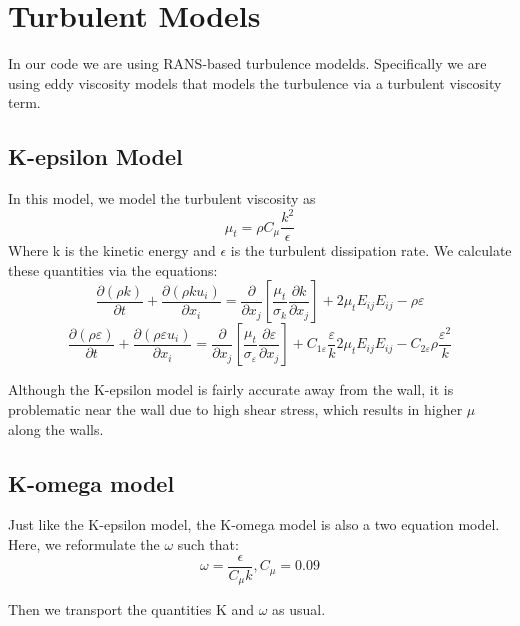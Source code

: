 \documentclass{article}
\begin{document}
\section{Turbulent Models}
In our code we are using RANS-based turbulence modelds. Specifically we are using eddy viscosity models that models the turbulence via a turbulent viscosity term. 

\subsection{K-epsilon Model}
In this model, we model the turbulent viscosity as
\begin{equation}
\mu_{t}=\rho C_{\mu} \frac{k^{2}}{\epsilon}
\end{equation}
Where k is the kinetic energy and $\epsilon$ is the turbulent dissipation rate. \newline
We calculate these quantities via the equations:
\begin{equation}
\frac{\partial(\rho k)}{\partial t}+\frac{\partial\left(\rho k u_{i}\right)}{\partial x_{i}}=\frac{\partial}{\partial x_{j}}\left[\frac{\mu_{t}}{\sigma_{k}} \frac{\partial k}{\partial x_{j}}\right]+2 \mu_{t} E_{i j} E_{i j}-\rho \varepsilon
\end{equation}
\begin{equation}
\frac{\partial(\rho \varepsilon)}{\partial t}+\frac{\partial\left(\rho \varepsilon u_{i}\right)}{\partial x_{i}}=\frac{\partial}{\partial x_{j}}\left[\frac{\mu_{t}}{\sigma_{\varepsilon}} \frac{\partial \varepsilon}{\partial x_{j}}\right]+C_{1 \varepsilon} \frac{\varepsilon}{k} 2 \mu_{t} E_{i j} E_{i j}-C_{2 \varepsilon} \rho \frac{\varepsilon^{2}}{k}
\end{equation}

Although the K-epsilon model is fairly accurate away from the wall, it is problematic near the wall due to high shear stress, which results in higher $\mu$ along the walls.

\subsection{K-omega model}
Just like the K-epsilon model, the K-omega model is also a two equation model. Here, we reformulate the $\omega$ such that:
\begin{equation}
\omega=\frac{\epsilon}{C_{\mu} k} , C_{\mu} = 0.09
\end{equation}

Then we transport the quantities K and $\omega$ as usual.
\end{document}
